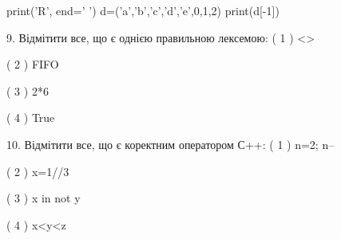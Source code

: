 \documentclass[11pt]{article}
\begin{document}
print('R', end=' ')
d=('a','b','c','d','e',0,1,2)
print(d[-1])



9. %
Відмітити все, що є однією правильною лексемою:
( 1 ) <>

( 2 ) FIFO

( 3 ) 2*6

( 4 ) True


10. %
Відмітити все, що є коректним оператором С++:
( 1 ) n=2; n--

( 2 ) x=1//3

( 3 ) x in not y

( 4 ) x<y<z


\newpage
\end{document}
